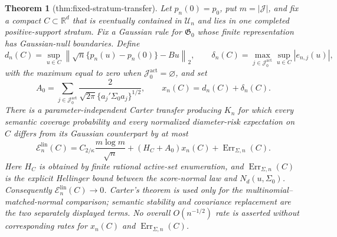 \documentclass{article}
\newtheorem{theorem}{Theorem}
\begin{document}
\begin{theorem}[thm:fixed-stratum-transfer]\label{thm:fixed-stratum-transfer}
Let \(p_n(0)=p_0\), put \(m=|\mathcal J|\), and fix a compact \(C\subset\mathbb R^d\) that is eventually contained in \(\mathcal U_n\) and lies in one completed positive-support stratum.  Fix a Gaussian rule for \(\mathfrak G_0\) whose finite representation has Gaussian-null boundaries.  Define
\[
d_n(C)=\sup_{u\in C}\left\|\sqrt n\{p_n(u)-p_n(0)\}-Bu\right\|_2,
\qquad
\delta_n(C)=\max_{j\in\mathcal J_0^{\mathrm{act}}}\sup_{u\in C}|e_{n,j}(u)|,
\]
with the maximum equal to zero when \(\mathcal J_0^{\mathrm{act}}=\varnothing\), and set
\[
A_0=\sum_{j\in\mathcal J_0^{\mathrm{act}}}
\frac{2}{\sqrt{2\pi}\{a_j'\Sigma_0a_j\}^{1/2}},
\qquad x_n(C)=d_n(C)+\delta_n(C).
\]
There is a parameter-independent Carter transfer producing \(K_n\) for which every semantic coverage probability and every normalized diameter-risk expectation on \(C\) differs from its Gaussian counterpart by at most
\[
\mathcal E_n^{\mathrm{lin}}(C)
=C_{2/\kappa}\frac{m\log m}{\sqrt n}
+(H_C+A_0)x_n(C)+\operatorname{Err}_{\Sigma,n}(C).
\]
Here \(H_C\) is obtained by finite rational active-set enumeration, and \(\operatorname{Err}_{\Sigma,n}(C)\) is the explicit Hellinger bound between the score-normal law and \(N_d(u,\Sigma_0)\).  Consequently \(\mathcal E_n^{\mathrm{lin}}(C)\to0\).  Carter's theorem is used only for the multinomial--matched-normal comparison; semantic stability and covariance replacement are the two separately displayed terms.  No overall \(O(n^{-1/2})\) rate is asserted without corresponding rates for \(x_n(C)\) and \(\operatorname{Err}_{\Sigma,n}(C)\).
\end{theorem}
\end{document}

